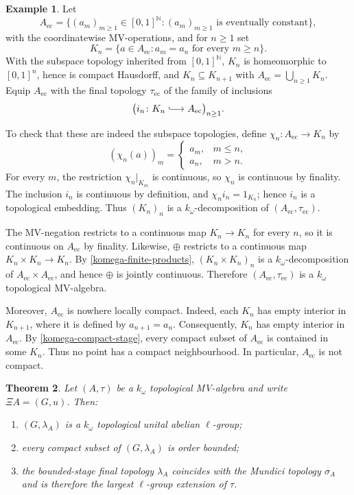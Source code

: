 \documentclass[preprint,3p]{elsarticle}
\theoremstyle{plain}
\newtheorem{thm}{Theorem}[section]
\theoremstyle{definition}
\newtheorem{exmp}[thm]{Example}
\newcommand{\longhookrightarrow}{\lhook\joinrel\longrightarrow}
\numberwithin{equation}{section}
\begin{document}
\begin{exmp}
Let
\[
 A_{\mathrm{ec}}
 =
 \bigl\{(a_m)_{m\geq1}\in[0,1]^{\mathbb N}:
        (a_m)_{m\geq1}\text{ is eventually constant}\bigr\},
\]
with the coordinatewise MV-operations, and for $n\geq1$ set
\[
 K_n=
 \bigl\{a\in A_{\mathrm{ec}}:a_m=a_n\text{ for every }m\geq n\bigr\}.
\]
With the subspace topology inherited from $[0,1]^{\mathbb N}$,
$K_n$ is homeomorphic to $[0,1]^n$, hence is compact Hausdorff, and
$K_n\subseteq K_{n+1}$ with
$A_{\mathrm{ec}}=\bigcup_{n\geq1}K_n$.  Equip $A_{\mathrm{ec}}$
with the final topology $\tau_{\mathrm{ec}}$ of the family of inclusions
\[
 \bigl(i_n\colon K_n\longhookrightarrow A_{\mathrm{ec}}\bigr)_{n\geq1}.
\]

To check that these are indeed the subspace topologies, define
$\chi_n\colon A_{\mathrm{ec}}\longrightarrow K_n$ by
\[
 (\chi_n(a))_m=
 \begin{cases}
  a_m,&m\leq n,\\
  a_n,&m>n.
 \end{cases}
\]
For every $m$, the restriction $\chi_n|_{K_m}$ is continuous, so $\chi_n$ is
continuous by finality.  The inclusion $i_n$ is continuous by definition, and
$\chi_ni_n=1_{K_n}$; hence $i_n$ is a topological embedding.  Thus
$(K_n)_n$ is a $k_\omega$-decomposition of
$(A_{\mathrm{ec}},\tau_{\mathrm{ec}})$.

The MV-negation restricts to a continuous map $K_n\longrightarrow K_n$ for every
$n$, so it is continuous on $A_{\mathrm{ec}}$ by finality.  Likewise,
$\oplus$ restricts to a continuous map $K_n\times K_n\longrightarrow K_n$.
By \ref{komega-finite-products}, $(K_n\times K_n)_n$ is a
$k_\omega$-decomposition of $A_{\mathrm{ec}}\times A_{\mathrm{ec}}$,
and hence $\oplus$ is jointly continuous.  Therefore
$(A_{\mathrm{ec}},\tau_{\mathrm{ec}})$ is a $k_\omega$ topological
MV-algebra.  

Moreover, $A_{\mathrm{ec}}$ is nowhere locally compact.
Indeed, each $K_n$ has empty interior in $K_{n+1}$,
where it is defined by $a_{n+1}=a_n$.
Consequently, $K_n$ has empty interior in $A_{\mathrm{ec}}$.
By \ref{komega-compact-stage}, every compact subset of
$A_{\mathrm{ec}}$ is contained in some $K_n$.
Thus no point has a compact neighbourhood.
In particular, $A_{\mathrm{ec}}$ is not compact.
\end{exmp}

\begin{thm}
\label{thm-komega-reconstruction}
Let $(A,\tau)$ be a $k_\omega$ topological MV-algebra and write
$\Xi A=(G,u)$.  Then:
\begin{enumerate}[label=(\alph*),ref=(\alph*)]
\item\label{thm-komega-reconstruction-topology}
$(G,\lambda_A)$ is a $k_\omega$ topological unital abelian
$\ell$-group;
\item\label{thm-komega-reconstruction-compact}
every compact subset of $(G,\lambda_A)$ is order bounded;
\item\label{thm-komega-reconstruction-maximality}
the bounded-stage final topology $\lambda_A$ coincides with the
Mundici topology $\sigma_A$ and is therefore the largest
$\ell$-group extension of $\tau$.
\end{enumerate}
\end{thm}
\end{document}
